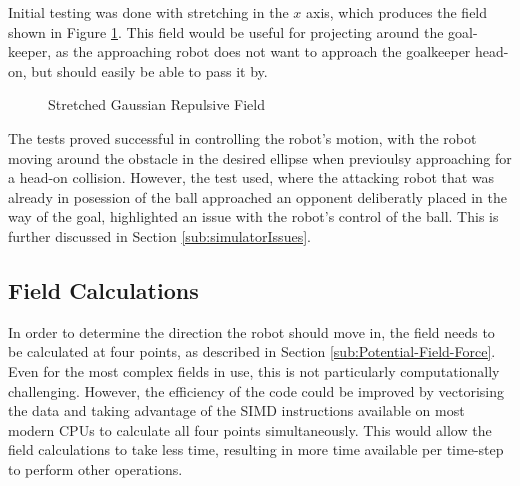\documentclass[10pt]{article}
\begin{document}
Initial testing was done with stretching in the $x$ axis, which produces the
field shown in Figure \ref{fig:stretchedGaussianField}.  This field would be
useful for projecting around the goal-keeper, as the approaching robot does not
want to approach the goalkeeper head-on, but should easily be able to pass it
by.

\begin{figure}
 \centering
 \caption{Stretched Gaussian Repulsive Field}
 \label{fig:stretchedGaussianField}
\end{figure}

The tests proved successful in controlling the robot's motion, with the robot
moving around the obstacle in the desired ellipse when previoulsy approaching
for a head-on collision.  However, the test used, where the attacking robot that
was already in posession of the ball approached an opponent deliberatly placed
in the way of the goal, highlighted an issue with the robot's control of the
ball.  This is further discussed in Section \ref{sub:simulatorIssues}.

\subsection{Field Calculations}

In order to determine the direction the robot should move in, the field needs to
be calculated at four points, as described in Section
\ref{sub:Potential-Field-Force}. Even for the most complex fields in use, this
is not particularly computationally challenging. However, the efficiency of the
code could be improved by vectorising the data and taking advantage of the
SIMD instructions available on most modern CPUs to calculate all four
points simultaneously. This would allow the field calculations to take less
time, resulting in more time available per time-step to perform other
operations.
\end{document}
